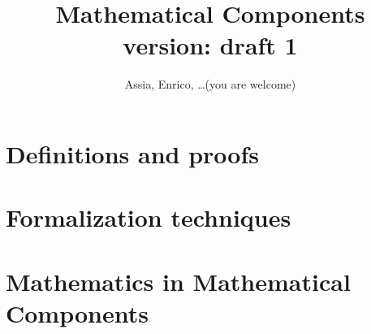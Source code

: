 \documentclass{book}
\title{Mathematical Components\\\small{version: draft 1}}
\author{Assia, Enrico, \ldots (you are welcome)}
\begin{document}
\maketitle

% 



\tableofcontents{}

\part{Definitions and proofs}







\part{Formalization techniques}





\part{Mathematics in Mathematical Components}

% 
% 
% 
\end{document}
